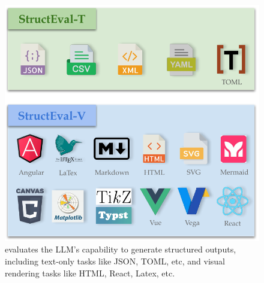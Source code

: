 
\begin{figure}[t]
    \centering
    \includegraphics[width=0.98\linewidth]{./figures/intro.pdf}
    \caption{\structeval evaluates the LLM's capability to generate structured outputs, including text-only tasks like JSON, TOML, etc, and visual rendering tasks like HTML, React, Latex, etc.}
    \label{fig:intro}
\end{figure}